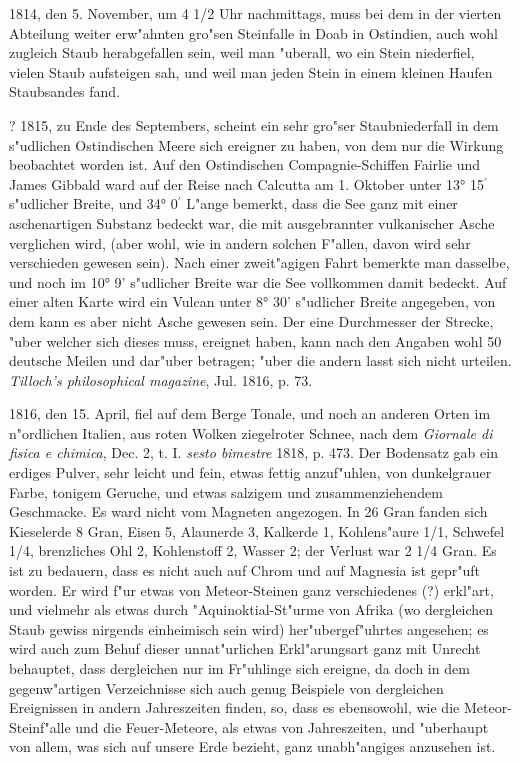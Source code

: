 \documentclass[a4paper, 11pt, oneside, polutonikogreek, german]{article}
\begin{document}
1814, den 5. November, um 4 1/2 Uhr nachmittags, muss bei dem in der vierten Abteilung weiter erw"ahnten gro"sen Steinfalle in Doab in Ostindien, auch wohl zugleich Staub herabgefallen sein, weil man "uberall, wo ein Stein niederfiel, vielen Staub aufsteigen sah, und weil man jeden Stein in einem kleinen Haufen Staubsandes fand.

? 1815, zu Ende des Septembers, scheint ein sehr gro"ser Staubniederfall in dem s"udlichen Ostindischen Meere sich ereigner zu haben, von dem nur die Wirkung beobachtet worden ist. Auf den Ostindischen Compagnie-Schiffen Fairlie und James Gibbald ward auf der Reise nach Calcutta am 1. Oktober unter 13° 15$^{\prime}$ s"udlicher Breite, und 34° 0$^{\prime}$ L"ange bemerkt, dass die See ganz mit einer aschenartigen Substanz bedeckt war, die mit ausgebrannter vulkanischer Asche verglichen wird, (aber wohl, wie in andern solchen F"allen, davon wird sehr verschieden gewesen sein). Nach einer zweit"agigen Fahrt bemerkte man dasselbe, und noch im 10° 9' s"udlicher Breite war die See vollkommen damit bedeckt. Auf einer alten Karte wird ein Vulcan unter 8° 30' s"udlicher Breite angegeben, von dem kann es aber nicht Asche gewesen sein. Der eine Durchmesser der Strecke, "uber welcher sich dieses muss, ereignet haben, kann nach den Angaben wohl 50 deutsche Meilen und dar"uber betragen; "uber die andern lasst sich nicht urteilen. \emph{Tilloch's philosophical magazine}, Jul. 1816, p. 73.

1816, den 15. April, fiel auf dem Berge Tonale, und noch an anderen Orten im n"ordlichen Italien, aus roten Wolken ziegelroter Schnee, nach dem \emph{Giornale di fisica e chimica}, Dec. 2, t. I. \emph{sesto bimestre} 1818, p. 473. Der Bodensatz gab ein erdiges Pulver, sehr leicht und fein, etwas fettig anzuf"uhlen, von dunkelgrauer Farbe, tonigem Geruche, und etwas salzigem und zusammenziehendem Geschmacke. Es ward nicht vom Magneten angezogen. In 26 Gran fanden sich Kieselerde 8 Gran, Eisen 5, Alaunerde 3, Kalkerde 1, Kohlens"aure 1/1, Schwefel 1/4, brenzliches Ohl 2, Kohlenstoff 2, Wasser 2; der Verlust war 2 1/4 Gran. Es ist zu bedauern, dass es nicht auch auf Chrom und auf Magnesia ist gepr"uft worden. Er wird f"ur etwas von Meteor-Steinen ganz verschiedenes (?) erkl"art, und vielmehr als etwas durch "Aquinoktial-St"urme von Afrika (wo dergleichen Staub gewiss nirgends einheimisch sein wird) her"ubergef"uhrtes angesehen; es wird auch zum Behuf dieser unnat"urlichen Erkl"arungsart ganz mit Unrecht behauptet, dass dergleichen nur im Fr"uhlinge sich ereigne, da doch in dem gegenw"artigen Verzeichnisse sich auch genug Beispiele von dergleichen Ereignissen in andern Jahreszeiten finden, so, dass es ebensowohl, wie die Meteor-Steinf"alle und die Feuer-Meteore, als etwas von Jahreszeiten, und "uberhaupt von allem, was sich auf unsere Erde bezieht, ganz unabh"angiges anzusehen ist.
\end{document}
